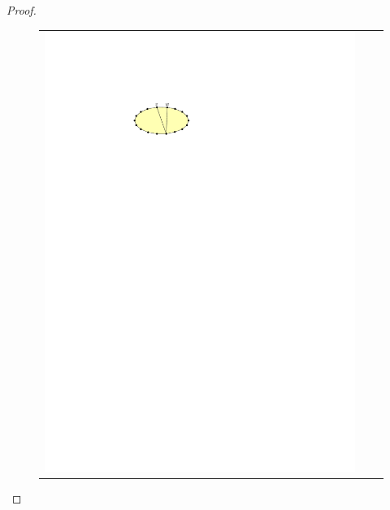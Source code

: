 \documentclass{article}
\theoremstyle{definition}
\begin{document}
\begin{proof}
\begin{figure}
\begin{tabular}{ccc}
      \includegraphics[page=4]{figs/minimal} &

\end{tabular}
\end{figure}
\end{proof}
\end{document}
